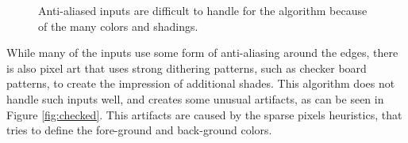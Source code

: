 \documentclass[]{usiinfbachelorproject}
\begin{document}
\begin{figure}[ht]
	\centering
	\caption{Anti-aliased inputs are difficult to handle for the algorithm because of the many colors and shadings.}
	\label{fig:golddragon}
\end{figure}

\noindent While many of the inputs use some form of anti-aliasing around the edges, there is also pixel art that uses strong dithering patterns, such as checker board patterns, to create the impression of additional shades. This algorithm does not handle such inputs well, and creates some unusual artifacts, as can be seen in Figure \ref{fig:checked}. This artifacts are caused by the sparse pixels heuristics, that tries to define the fore-ground and back-ground colors.
\end{document}

